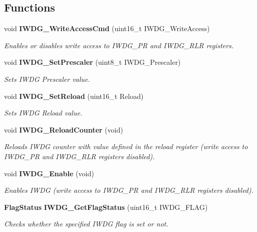 \subsection*{Functions}
\begin{DoxyCompactItemize}
\item 
void \textbf{ I\+W\+D\+G\+\_\+\+Write\+Access\+Cmd} (uint16\+\_\+t I\+W\+D\+G\+\_\+\+Write\+Access)
\begin{DoxyCompactList}\small\item\em Enables or disables write access to I\+W\+D\+G\+\_\+\+PR and I\+W\+D\+G\+\_\+\+R\+LR registers. \end{DoxyCompactList}\item 
void \textbf{ I\+W\+D\+G\+\_\+\+Set\+Prescaler} (uint8\+\_\+t I\+W\+D\+G\+\_\+\+Prescaler)
\begin{DoxyCompactList}\small\item\em Sets I\+W\+DG Prescaler value. \end{DoxyCompactList}\item 
void \textbf{ I\+W\+D\+G\+\_\+\+Set\+Reload} (uint16\+\_\+t Reload)
\begin{DoxyCompactList}\small\item\em Sets I\+W\+DG Reload value. \end{DoxyCompactList}\item 
void \textbf{ I\+W\+D\+G\+\_\+\+Reload\+Counter} (void)
\begin{DoxyCompactList}\small\item\em Reloads I\+W\+DG counter with value defined in the reload register (write access to I\+W\+D\+G\+\_\+\+PR and I\+W\+D\+G\+\_\+\+R\+LR registers disabled). \end{DoxyCompactList}\item 
void \textbf{ I\+W\+D\+G\+\_\+\+Enable} (void)
\begin{DoxyCompactList}\small\item\em Enables I\+W\+DG (write access to I\+W\+D\+G\+\_\+\+PR and I\+W\+D\+G\+\_\+\+R\+LR registers disabled). \end{DoxyCompactList}\item 
\textbf{ Flag\+Status} \textbf{ I\+W\+D\+G\+\_\+\+Get\+Flag\+Status} (uint16\+\_\+t I\+W\+D\+G\+\_\+\+F\+L\+AG)
\begin{DoxyCompactList}\small\item\em Checks whether the specified I\+W\+DG flag is set or not. \end{DoxyCompactList}\end{DoxyCompactItemize}



